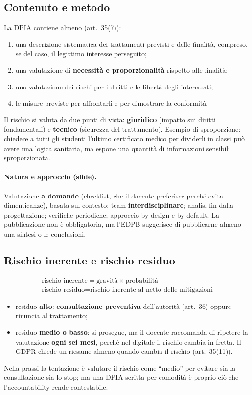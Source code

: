 \subsection{Contenuto e metodo}
La DPIA contiene almeno (art.~35(7)):
\begin{enumerate}[label=(\alph*)]
  \item una descrizione sistematica dei trattamenti previsti e delle finalità, compreso, se del caso, il
    legittimo interesse perseguito;
  \item una valutazione di \textbf{necessità e proporzionalità} rispetto alle finalità;
  \item una valutazione dei rischi per i diritti e le libertà degli interessati;
  \item le misure previste per affrontarli e per dimostrare la conformità.
\end{enumerate}
Il rischio si valuta da due punti di vista: \textbf{giuridico} (impatto sui diritti fondamentali) e
\textbf{tecnico} (sicurezza del trattamento). Esempio di sproporzione: chiedere a tutti gli studenti
l'ultimo certificato medico per dividerli in classi può avere una logica sanitaria, ma espone una quantità
di informazioni sensibili sproporzionata.

\paragraph{Natura e approccio (slide).} Valutazione \textbf{a domande} (checklist, che il docente
preferisce perché evita dimenticanze), basata sul contesto; team \textbf{interdisciplinare}; analisi fin
dalla progettazione; verifiche periodiche; approccio by design e by default. La pubblicazione non è
obbligatoria, ma l'EDPB suggerisce di pubblicarne almeno una sintesi o le conclusioni.

\subsection{Rischio inerente e rischio residuo}
\begin{gather*}
\text{rischio inerente} = \text{gravità} \times \text{probabilità}\\
\text{rischio residuo} = \text{rischio inerente al netto delle mitigazioni}
\end{gather*}
\begin{itemize}
  \item residuo \textbf{alto}: \textbf{consultazione preventiva} dell'autorità (art.~36) oppure rinuncia
    al trattamento;
  \item residuo \textbf{medio o basso}: si prosegue, ma il docente raccomanda di ripetere la valutazione
    \textbf{ogni sei mesi}, perché nel digitale il rischio cambia in fretta. Il GDPR chiede un riesame
    almeno quando cambia il rischio (art.~35(11)).
\end{itemize}
Nella prassi la tentazione è valutare il rischio come ``medio'' per evitare sia la consultazione sia lo
stop; ma una DPIA scritta per comodità è proprio ciò che l'accountability rende contestabile.

